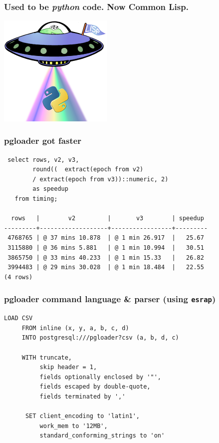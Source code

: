 \documentclass{beamer}
\begin{document}
\begin{frame}
  \frametitle{Used to be \textit{python} code. Now Common Lisp.}

  \begin{center}
    \includegraphics[height=2.1in]{lisp-python.png}
  \end{center}
\end{frame}

\begin{frame}[fragile]
  \frametitle{pgloader got faster}

  \begin{verbatim}
 select rows, v2, v3,
        round((  extract(epoch from v2)
        / extract(epoch from v3))::numeric, 2)
        as speedup
   from timing;
        
  rows   |        v2         |       v3        | speedup 
---------+-------------------+-----------------+---------
 4768765 | @ 37 mins 10.878  | @ 1 min 26.917  |   25.67
 3115880 | @ 36 mins 5.881   | @ 1 min 10.994  |   30.51
 3865750 | @ 33 mins 40.233  | @ 1 min 15.33   |   26.82
 3994483 | @ 29 mins 30.028  | @ 1 min 18.484  |   22.55
(4 rows)
  \end{verbatim}
\end{frame}

\begin{frame}[fragile]
  \frametitle{pgloader command language \& parser (using \texttt{esrap})}

  \begin{verbatim}
LOAD CSV
     FROM inline (x, y, a, b, c, d)
     INTO postgresql:///pgloader?csv (a, b, d, c)

     WITH truncate,
          skip header = 1,
          fields optionally enclosed by '"',
          fields escaped by double-quote,
          fields terminated by ','

      SET client_encoding to 'latin1',
          work_mem to '12MB',
          standard_conforming_strings to 'on'
  \end{verbatim}
\end{frame}
\end{document}
